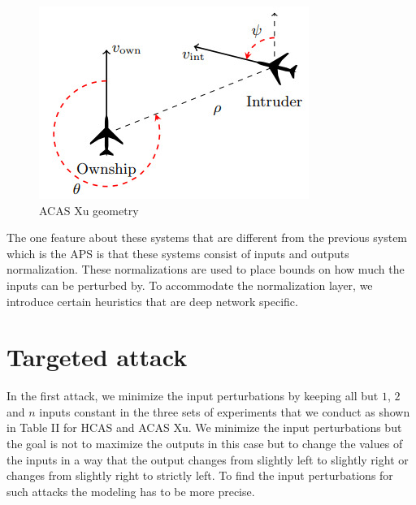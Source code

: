 \begin{figure}
	\centering
	\includegraphics[width=0.7\linewidth]{Images/ACASXugeometry}
	\caption[ACAS Xu]{ACAS Xu geometry}
	\label{fig:acasxugeometry}
\end{figure}

The one feature about these systems that are different from the previous system which is the APS is that these systems consist of inputs and outputs normalization. These normalizations are used to place bounds on how much the inputs can be perturbed by. To accommodate the normalization layer, we introduce certain heuristics that are deep network specific. %

\section{Targeted attack} 
In the first attack, we minimize the input perturbations by keeping all but $1$, $2$ and $n$ inputs constant in the three sets of experiments that we conduct as shown in Table II for HCAS and ACAS Xu. We minimize the input perturbations but the goal is not to maximize the outputs in this case but to change the values of the inputs in a way that the output changes from slightly left to slightly right or changes from slightly right to strictly left. To find the input perturbations for such attacks the modeling has to be more precise.

